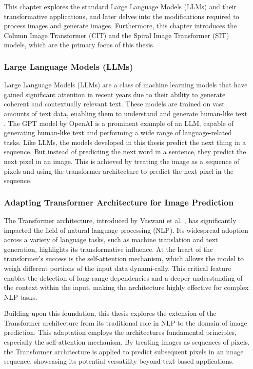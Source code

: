     This chapter explores the standard Large Language Models (LLMs) and their transformative applications, and later delves into the modifications required to process images and generate images. Furthermore, this chapter introduces the Column Image Transformer (CIT) and the Spiral Image Transformer (SIT) models, which are the primary focus of this thesis.

    \subsubsection{Large Language Models (LLMs)}

    Large Language Models (LLMs) are a class of machine learning models that have gained significant attention in recent years due to their ability to generate coherent and contextually relevant text. These models are trained on vast amounts of text data, enabling them to understand and generate human-like text \autocite{roth-2024}. The GPT model by OpenAI \autocite{GPT2radford2019} is a prominent example of an LLM, capable of generating human-like text and performing a wide range of language-related tasks. Like LLMs, the models developed in this thesis predict the next thing in a sequence. But instead of predicting the next word in a sentence, they predict the next pixel in an image. This is achieved by treating the image as a sequence of pixels and using the transformer architecture to predict the next pixel in the sequence.

    \subsubsection{Adapting Transformer Architecture for Image Prediction}

    The Transformer architecture, introduced by Vaswani et al. \autocite{vaswani2023attention}, has significantly impacted the field of natural language processing (NLP). Its widespread adoption across a variety of language tasks, such as machine translation and text generation, highlights its transformative influence. At the heart of the transformer's success is the self-attention mechanism, which allows the model to weigh different portions of the input data dynami-cally. This critical feature enables the detection of long-range dependencies and a deeper understanding of the context within the input, making the architecture highly effective for complex NLP tasks.

    Building upon this foundation, this thesis explores the extension of the Transformer architecture from its traditional role in NLP to the domain of image prediction. This adaptation employs the architectures fundamental principles, especially the self-attention mechanism. By treating images as sequences of pixels, the Transformer architecture is applied to predict subsequent pixels in an image sequence, showcasing its potential versatility beyond text-based applications.
    
